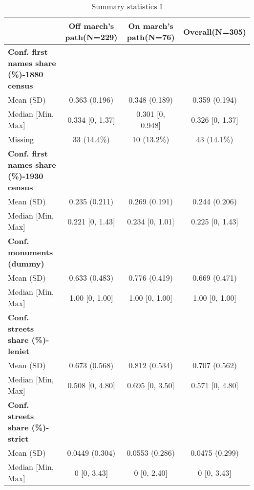 \begin{table}[h]

\caption{\label{tab:desc_stat_names}Summary statistics I}
\centering
\fontsize{8}{10}\selectfont
\begin{tabular}[t]{>{}lccc}
\toprule
 & Off march's path(N=229) & On march's path(N=76) & Overall(N=305)\\
\midrule
\textbf{Conf. first names share (\%)-1880 census} &  &  & \\
Mean (SD) & 0.363 (0.196) & 0.348 (0.189) & 0.359 (0.194)\\
Median [Min, Max] & 0.334 [0, 1.37] & 0.301 [0, 0.948] & 0.326 [0, 1.37]\\
Missing & 33 (14.4\%) & 10 (13.2\%) & 43 (14.1\%)\\
\addlinespace
\textbf{Conf. first names share (\%)-1930 census} &  &  & \\
Mean (SD) & 0.235 (0.211) & 0.269 (0.191) & 0.244 (0.206)\\
Median [Min, Max] & 0.221 [0, 1.43] & 0.234 [0, 1.01] & 0.225 [0, 1.43]\\
\addlinespace
\textbf{Conf. monuments (dummy)} &  &  & \\
Mean (SD) & 0.633 (0.483) & 0.776 (0.419) & 0.669 (0.471)\\
Median [Min, Max] & 1.00 [0, 1.00] & 1.00 [0, 1.00] & 1.00 [0, 1.00]\\
\addlinespace
\textbf{Conf. streets share (\%)-leniet} &  &  & \\
Mean (SD) & 0.673 (0.568) & 0.812 (0.534) & 0.707 (0.562)\\
Median [Min, Max] & 0.508 [0, 4.80] & 0.695 [0, 3.50] & 0.571 [0, 4.80]\\
\addlinespace
\textbf{Conf. streets share (\%)-strict} &  &  & \\
Mean (SD) & 0.0449 (0.304) & 0.0553 (0.286) & 0.0475 (0.299)\\
Median [Min, Max] & 0 [0, 3.43] & 0 [0, 2.40] & 0 [0, 3.43]\\
\bottomrule
\end{tabular}
\end{table}
